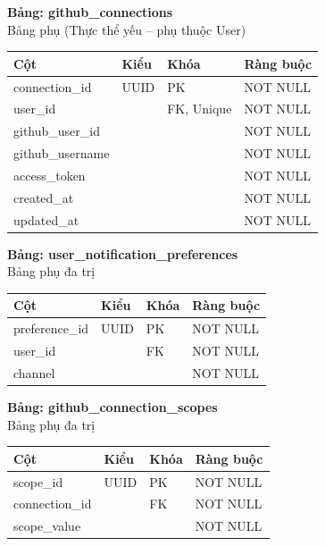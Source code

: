 \textbf{Bảng: github\_connections}\\
Bảng phụ (Thực thể yếu – phụ thuộc User)
\begin{table}[H]
\centering
\begin{tabular}{|l|l|l|l|}
\hline
\textbf{Cột} & \textbf{Kiểu} & \textbf{Khóa} & \textbf{Ràng buộc} \\ \hline
connection\_id & UUID & PK & NOT NULL \\ \hline
user\_id & & FK, Unique & NOT NULL \\ \hline
github\_user\_id & & & NOT NULL \\ \hline
github\_username & & & NOT NULL \\ \hline
access\_token & & & NOT NULL \\ \hline
created\_at & & & NOT NULL \\ \hline
updated\_at & & & NOT NULL \\ \hline
\end{tabular}
\end{table}

\textbf{Bảng: user\_notification\_preferences}\\
Bảng phụ đa trị
\begin{table}[H]
\centering
\begin{tabular}{|l|l|l|l|}
\hline
\textbf{Cột} & \textbf{Kiểu} & \textbf{Khóa} & \textbf{Ràng buộc} \\ \hline
preference\_id & UUID & PK & NOT NULL \\ \hline
user\_id & & FK & NOT NULL \\ \hline
channel & & & NOT NULL \\ \hline
\end{tabular}
\end{table}

\textbf{Bảng: github\_connection\_scopes}\\
Bảng phụ đa trị
\begin{table}[H]
\centering
\begin{tabular}{|l|l|l|l|}
\hline
\textbf{Cột} & \textbf{Kiểu} & \textbf{Khóa} & \textbf{Ràng buộc} \\ \hline
scope\_id & UUID & PK & NOT NULL \\ \hline
connection\_id & & FK & NOT NULL \\ \hline
scope\_value & & & NOT NULL \\ \hline
\end{tabular}
\end{table}


